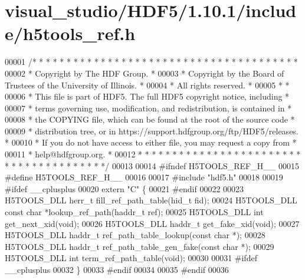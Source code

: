 \hypertarget{visual__studio_2_h_d_f5_21_810_81_2include_2h5tools__ref_8h_source}{}\section{visual\+\_\+studio/\+H\+D\+F5/1.10.1/include/h5tools\+\_\+ref.h}
\label{visual__studio_2_h_d_f5_21_810_81_2include_2h5tools__ref_8h_source}

\begin{DoxyCode}
00001 \textcolor{comment}{/* * * * * * * * * * * * * * * * * * * * * * * * * * * * * * * * * * * * * * *}
00002 \textcolor{comment}{ * Copyright by The HDF Group.                                               *}
00003 \textcolor{comment}{ * Copyright by the Board of Trustees of the University of Illinois.         *}
00004 \textcolor{comment}{ * All rights reserved.                                                      *}
00005 \textcolor{comment}{ *                                                                           *}
00006 \textcolor{comment}{ * This file is part of HDF5.  The full HDF5 copyright notice, including     *}
00007 \textcolor{comment}{ * terms governing use, modification, and redistribution, is contained in    *}
00008 \textcolor{comment}{ * the COPYING file, which can be found at the root of the source code       *}
00009 \textcolor{comment}{ * distribution tree, or in https://support.hdfgroup.org/ftp/HDF5/releases.  *}
00010 \textcolor{comment}{ * If you do not have access to either file, you may request a copy from     *}
00011 \textcolor{comment}{ * help@hdfgroup.org.                                                        *}
00012 \textcolor{comment}{ * * * * * * * * * * * * * * * * * * * * * * * * * * * * * * * * * * * * * * */}
00013 
00014 \textcolor{preprocessor}{#ifndef H5TOOLS\_REF\_H\_\_}
00015 \textcolor{preprocessor}{#define H5TOOLS\_REF\_H\_\_}
00016 
00017 \textcolor{preprocessor}{#include "hdf5.h"}
00018 
00019 \textcolor{preprocessor}{#ifdef \_\_cplusplus}
00020 \textcolor{keyword}{extern} \textcolor{stringliteral}{"C"} \{
00021 \textcolor{preprocessor}{#endif}
00022 
00023 H5TOOLS\_DLL herr\_t      fill\_ref\_path\_table(hid\_t fid);
00024 H5TOOLS\_DLL \textcolor{keyword}{const} \textcolor{keywordtype}{char} *lookup\_ref\_path(haddr\_t ref);
00025 H5TOOLS\_DLL \textcolor{keywordtype}{int}         get\_next\_xid(\textcolor{keywordtype}{void});
00026 H5TOOLS\_DLL haddr\_t     get\_fake\_xid(\textcolor{keywordtype}{void});
00027 H5TOOLS\_DLL haddr\_t     ref\_path\_table\_lookup(\textcolor{keyword}{const} \textcolor{keywordtype}{char} *);
00028 H5TOOLS\_DLL haddr\_t     ref\_path\_table\_gen\_fake(\textcolor{keyword}{const} \textcolor{keywordtype}{char} *);
00029 H5TOOLS\_DLL \textcolor{keywordtype}{int}         term\_ref\_path\_table(\textcolor{keywordtype}{void});
00030 
00031 \textcolor{preprocessor}{#ifdef \_\_cplusplus}
00032 \}
00033 \textcolor{preprocessor}{#endif}
00034 
00035 \textcolor{preprocessor}{#endif}
00036 
\end{DoxyCode}
